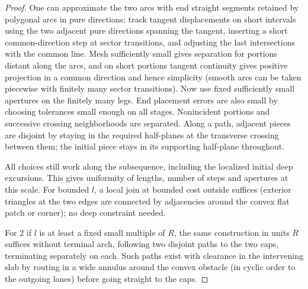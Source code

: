 \begin{proof}
One can approximate the two arcs with end straight segments retained by polygonal arcs in pure directions: track tangent displacements on short intervals using the two adjacent pure directions spanning the tangent, inserting a short common-direction step at sector transitions, and adjusting the last intersections with the common line. Mesh sufficiently small gives separation for portions distant along the arcs, and on short portions tangent continuity gives positive projection in a common direction and hence simplicity (smooth arcs can be taken piecewise with finitely many sector transitions). Now use fixed sufficiently small apertures on the finitely many legs. End placement errors are also small by choosing tolerances small enough on all stages. Nonincident portions and successive crossing neighborhoods are separated. Along a path, adjacent pieces are disjoint by staying in the required half-planes at the transverse crossing between them; the initial piece stays in its supporting half-plane throughout. 

All choices still work along the subsequence, including the localized initial deep excursions. This gives uniformity of lengths, number of steps and apertures at this scale. For bounded \(l\), a local join at bounded cost outside suffices (exterior triangles at the two edges are connected by adjacencies around the convex flat patch or corner); no deep constraint needed.

For 2 if \(l\) is at least a fixed small multiple of \(R\), the same construction in units \(R\) suffices without terminal arch, following two disjoint paths to the two caps, terminating separately on each. Such paths exist with clearance in the intervening slab by routing in a wide annulus around the convex obstacle (in cyclic order to the outgoing lanes) before going straight to the caps. 


\end{proof}

